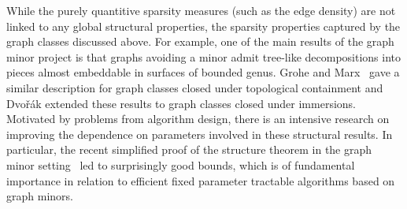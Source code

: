 While the purely quantitive sparsity measures (such as the edge density) are not linked to any global structural properties,
the sparsity properties captured by the graph classes discussed above.
For example, one of the main results of the graph minor project is that
graphs avoiding a minor admit tree-like decompositions into pieces almost embeddable in surfaces of bounded genus.
Grohe and Marx~\cite{} gave a similar description for graph classes closed under topological containment and
Dvo\v r\'ak extended these results to graph classes closed under immersions.
Motivated by problems from algorithm design,
there is an intensive research on improving the dependence on parameters involved in these structural results.
In particular,
the recent simplified proof of the structure theorem in the graph minor setting~\cite{KawarabThomasWollan}
led to surprisingly good bounds,
which is of fundamental importance in relation to efficient fixed parameter tractable algorithms based on graph minors.
